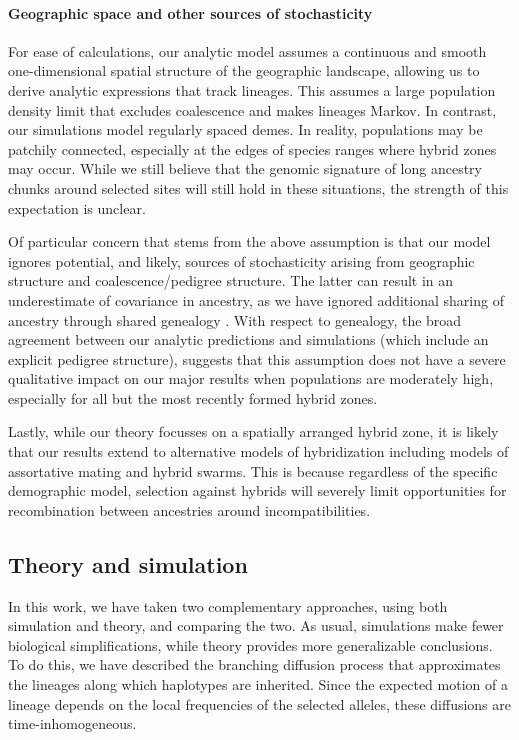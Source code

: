 \documentclass[11pt,letterpaper]{article}
\begin{document}
\paragraph{Geographic space and other sources of stochasticity}
For ease of calculations, our analytic model assumes a continuous and smooth one-dimensional spatial structure of the geographic landscape, allowing us to derive analytic expressions that track lineages. 
This assumes a large population density limit that excludes coalescence and makes lineages Markov.  
In contrast, our simulations model regularly spaced demes. 
In reality, populations may be patchily connected, especially at the edges of species ranges where hybrid zones may occur. 
While we still believe that the genomic signature of long ancestry chunks around selected sites will still hold in these situations, the strength of this expectation is unclear. 

Of particular concern that stems from the above assumption is that our model ignores potential, and likely, sources of stochasticity arising from geographic structure and coalescence/pedigree structure. The latter can result in an underestimate of covariance in ancestry, as we have ignored additional sharing of ancestry through shared genealogy \cite{Liang2014}. With respect to genealogy, the broad agreement between our analytic predictions and simulations (which include an explicit pedigree structure), suggests that this assumption does not have a severe qualitative impact on our major results when populations are moderately high, especially for all but the most recently formed hybrid zones. 

Lastly, while our theory focusses on a spatially arranged hybrid zone, it is likely that our results extend to alternative models of hybridization including models of assortative mating and hybrid swarms. This is because regardless of the specific demographic model, selection against hybrids will severely limit opportunities for recombination between ancestries around incompatibilities.




\subsection*{Theory and simulation}
In this work, we have taken two complementary approaches,
using both simulation and theory, and comparing the two.
As usual, simulations make fewer biological simplifications,
while theory provides more generalizable conclusions.
To do this, we have described the branching diffusion process that approximates
the lineages along which haplotypes are inherited.
Since the expected motion of a lineage depends on the local frequencies of the selected alleles,
these diffusions are time-inhomogeneous.
\end{document}
